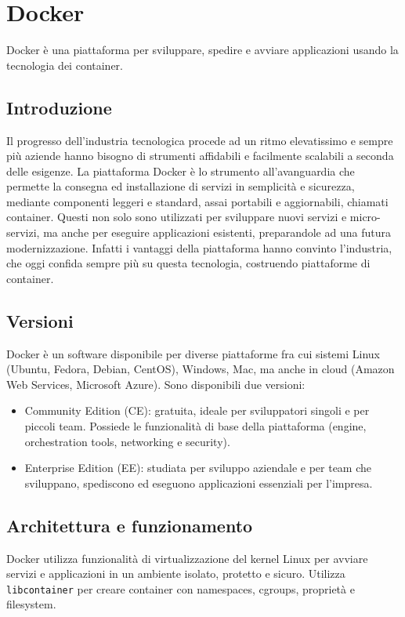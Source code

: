 \chapter{Docker}
\label{Docker}
\thispagestyle{empty}

Docker è una piattaforma per sviluppare, spedire e avviare applicazioni usando la tecnologia dei container.

\section{Introduzione}
Il progresso dell'industria tecnologica procede ad un ritmo elevatissimo e sempre più aziende hanno bisogno di strumenti affidabili e facilmente scalabili a seconda delle esigenze. La piattaforma Docker è lo strumento all'avanguardia che permette la consegna ed installazione di servizi in semplicità e sicurezza, mediante componenti leggeri e standard, assai portabili e aggiornabili, chiamati container. Questi non solo sono utilizzati per sviluppare nuovi servizi e micro-servizi, ma anche per eseguire applicazioni esistenti, preparandole ad una futura modernizzazione. Infatti i vantaggi della piattaforma hanno convinto l'industria, che oggi confida sempre più su questa tecnologia, costruendo piattaforme di container.

\section{Versioni}
Docker è un software disponibile per diverse piattaforme fra cui sistemi Linux (Ubuntu, Fedora, Debian, CentOS), Windows, Mac, ma anche in cloud (Amazon Web Services, Microsoft Azure). Sono disponibili due versioni:
\begin{itemize}
    \item Community Edition (CE): gratuita, ideale per sviluppatori singoli e per piccoli team. Possiede le funzionalità di base della piattaforma (engine, orchestration tools, networking e security).
    \item Enterprise Edition (EE): studiata per sviluppo aziendale e per team che sviluppano, spediscono ed eseguono applicazioni essenziali per l'impresa.
\end{itemize}

\section{Architettura e funzionamento}
Docker utilizza funzionalità di virtualizzazione del kernel Linux per avviare servizi e applicazioni in un ambiente isolato, protetto e sicuro. Utilizza \verb|libcontainer| per creare container con namespaces, cgroups, proprietà e filesystem.

